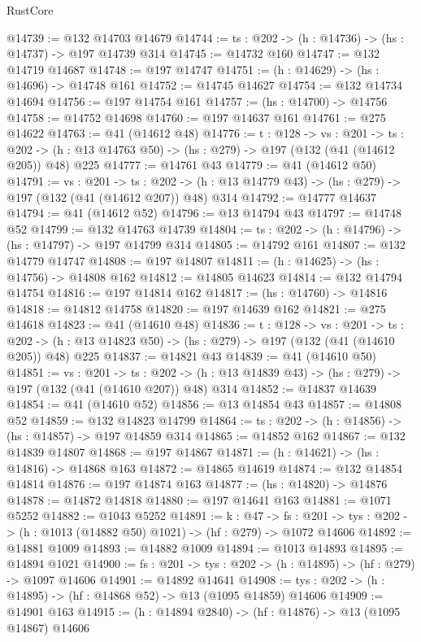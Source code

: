 \begin{lexlean}{RustCore}
\begin{coremodule}
@14739 := @132 @14703 @14679
@14744 := {ts : @202} -> (h : @14736) -> (hs : @14737) -> @197 @14739 @314
@14745 := @14732 @160
@14747 := @132 @14719 @14687
@14748 := @197 @14747
@14751 := (h : @14629) -> (hs : @14696) -> @14748 @161
@14752 := @14745 @14627
@14754 := @132 @14734 @14694
@14756 := @197 @14754 @161
@14757 := (hs : @14700) -> @14756
@14758 := @14752 @14698
@14760 := @197 @14637 @161
@14761 := @275 @14622
@14763 := @41 (@14612 @48)
@14776 := {t : @128} ->
  {vs : @201} ->
  {ts : @202} -> (h : @13 @14763 @50) -> (hs : @279) -> @197 (@132 (@41 (@14612 @205)) @48) @225
@14777 := @14761 @43
@14779 := @41 (@14612 @50)
@14791 := {vs : @201} ->
  {ts : @202} -> (h : @13 @14779 @43) -> (hs : @279) -> @197 (@132 (@41 (@14612 @207)) @48) @314
@14792 := @14777 @14637
@14794 := @41 (@14612 @52)
@14796 := @13 @14794 @43
@14797 := @14748 @52
@14799 := @132 @14763 @14739
@14804 := {ts : @202} -> (h : @14796) -> (hs : @14797) -> @197 @14799 @314
@14805 := @14792 @161
@14807 := @132 @14779 @14747
@14808 := @197 @14807
@14811 := (h : @14625) -> (hs : @14756) -> @14808 @162
@14812 := @14805 @14623
@14814 := @132 @14794 @14754
@14816 := @197 @14814 @162
@14817 := (hs : @14760) -> @14816
@14818 := @14812 @14758
@14820 := @197 @14639 @162
@14821 := @275 @14618
@14823 := @41 (@14610 @48)
@14836 := {t : @128} ->
  {vs : @201} ->
  {ts : @202} -> (h : @13 @14823 @50) -> (hs : @279) -> @197 (@132 (@41 (@14610 @205)) @48) @225
@14837 := @14821 @43
@14839 := @41 (@14610 @50)
@14851 := {vs : @201} ->
  {ts : @202} -> (h : @13 @14839 @43) -> (hs : @279) -> @197 (@132 (@41 (@14610 @207)) @48) @314
@14852 := @14837 @14639
@14854 := @41 (@14610 @52)
@14856 := @13 @14854 @43
@14857 := @14808 @52
@14859 := @132 @14823 @14799
@14864 := {ts : @202} -> (h : @14856) -> (hs : @14857) -> @197 @14859 @314
@14865 := @14852 @162
@14867 := @132 @14839 @14807
@14868 := @197 @14867
@14871 := (h : @14621) -> (hs : @14816) -> @14868 @163
@14872 := @14865 @14619
@14874 := @132 @14854 @14814
@14876 := @197 @14874 @163
@14877 := (hs : @14820) -> @14876
@14878 := @14872 @14818
@14880 := @197 @14641 @163
@14881 := @1071 @5252
@14882 := @1043 @5252
@14891 := {k : @47} ->
  {fs : @201} -> {tys : @202} -> (h : @1013 (@14882 @50) @1021) -> (hf : @279) -> @1072 @14606
@14892 := @14881 @1009
@14893 := @14882 @1009
@14894 := @1013 @14893
@14895 := @14894 @1021
@14900 := {fs : @201} -> {tys : @202} -> (h : @14895) -> (hf : @279) -> @1097 @14606
@14901 := @14892 @14641
@14908 := {tys : @202} -> (h : @14895) -> (hf : @14868 @52) -> @13 (@1095 @14859) @14606
@14909 := @14901 @163
@14915 := (h : @14894 @2840) -> (hf : @14876) -> @13 (@1095 @14867) @14606

\end{coremodule}
\end{lexlean}
